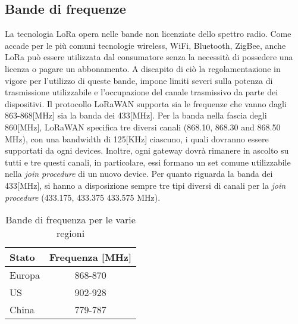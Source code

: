 \subsection{Bande di frequenze}
La tecnologia LoRa opera nelle bande non licenziate dello spettro radio.  Come
accade per le più comuni tecnologie wireless, WiFi, Bluetooth, ZigBee, anche LoRa
può essere utilizzata dal consumatore senza la necessità di possedere una
licenza o pagare un abbonamento.
A discapito di ciò la regolamentazione in vigore per l'utilizzo di queste bande,
impone limiti severi sulla potenza di trasmissione utilizzabile e l'occupazione
del canale trasmissivo da parte dei dispositivi.
Il protocollo  LoRaWAN supporta sia le frequenze che vanno dagli
863-868[MHz] sia la banda dei 433[MHz]. Per la banda  nella fascia
degli 860[MHz], LoRaWAN specifica tre diversi canali (868.10, 868.30 and 868.50
MHz), con una bandwidth di 125[KHz] ciascuno, i quali dovranno essere supportati
da ogni devices. Inoltre, ogni gateway dovrà
rimanere in ascolto su tutti e tre questi canali, in particolare, essi
formano un set comune utilizzabile nella \emph{join procedure} di un nuovo
device. Per
quanto riguarda la banda dei 433[MHz], si hanno a disposizione sempre tre tipi
diversi di canali per la \emph{join procedure} (433.175, 
433.375  433.575 MHz). 
\begin{table}[ht]
        \centering
        \begin{tabular}{l|c}
                \toprule
                Stato   & Frequenza [MHz] \\
                \hline
                Europa  & 868-870 \\
                US      & 902-928 \\
                China   & 779-787 \\
                \bottomrule
        \end{tabular}
        \caption{Bande di frequenza per le varie regioni}
\end{table}

